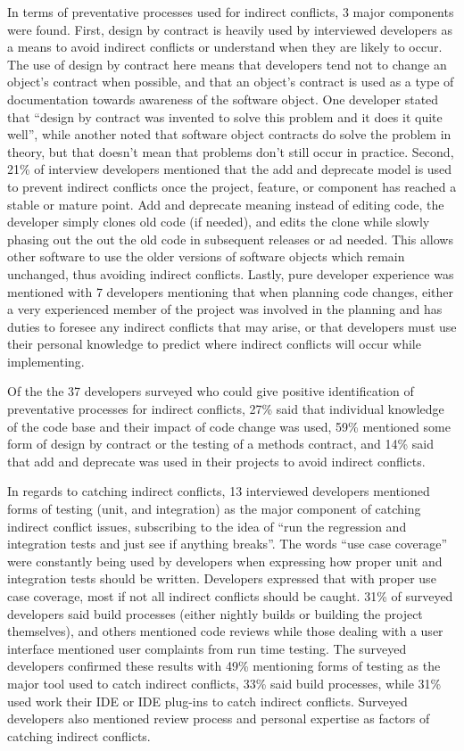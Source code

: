 In terms of preventative processes used for indirect conflicts, 3 major components were found.
First, design by contract is heavily used by interviewed developers as a means to avoid indirect conflicts or understand
when they are likely to occur. The use of design by contract here means that developers tend not to change an object's
contract when possible, and that an object's contract is used as a type of documentation towards awareness of the 
software object. One developer stated that ``design by contract was invented to solve this problem and it does it 
quite well'', while another noted that software object contracts do solve the problem in theory, but that doesn't 
mean that problems don't still occur in practice.
Second, 21\% of interview developers mentioned that the add and deprecate 
model is used to prevent indirect conflicts once
the project, feature, or component has reached a stable or mature point.
Add and deprecate meaning instead of editing code, the developer simply clones old code (if needed), and edits the clone
while slowly phasing out the out the old code in subsequent releases or ad needed. This allows other software to 
use the older versions of software objects which remain unchanged, thus avoiding indirect conflicts.
Lastly, pure developer experience was mentioned with 7 developers mentioning that when planning code changes, 
either a very experienced member of the project was involved in the planning and has duties to foresee any 
indirect conflicts that may arise, or that developers must use their personal knowledge to predict where indirect 
conflicts will occur while implementing.

Of the the 37 developers surveyed who could give positive identification of preventative processes for indirect conflicts,
27\% said that individual knowledge of the code base and their impact of code change was used, 59\% mentioned some form of design
by contract or the testing of a methods contract, and 14\% said that add and
deprecate was used in their projects to avoid indirect conflicts.

In regards to catching indirect conflicts, 13 interviewed developers mentioned forms of testing (unit, and integration) 
as the major component of catching indirect conflict issues, subscribing to the idea of ``run the regression and integration 
tests and just see if anything breaks''. The words ``use case coverage'' were constantly being used by developers
when expressing how proper unit and integration tests should be written. Developers expressed that with proper use case coverage, most if
not all indirect conflicts should be caught. 31\% of surveyed developers said build processes (either nightly builds or building the project 
themselves), and others mentioned code reviews while those dealing with a user interface mentioned user complaints from run 
time testing. The surveyed developers confirmed these results with 49\% mentioning forms of testing as the major tool used to 
catch indirect conflicts, 33\% said build processes, while 31\% used work their IDE or IDE plug-ins to catch indirect conflicts.
Surveyed developers also mentioned review process and personal expertise as factors of catching indirect conflicts.

